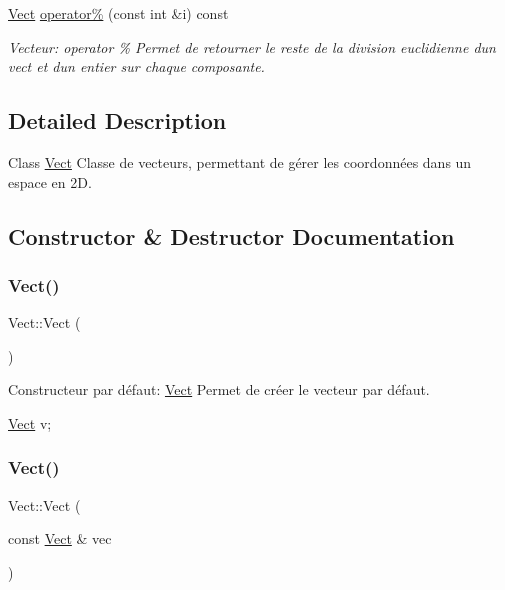 \begin{DoxyCompactItemize}
\hyperlink{classVect}{Vect} \hyperlink{classVect_a7c95db0096c212593a83992d8c9cc42a}{operator\%} (const int \&i) const
\begin{DoxyCompactList}\small\item\em Vecteur\+: operator \% Permet de retourner le reste de la division euclidienne d\textquotesingle{}un vect et d\textquotesingle{}un entier sur chaque composante. \end{DoxyCompactList}\end{DoxyCompactItemize}


\subsection{Detailed Description}
Class \hyperlink{classVect}{Vect} Classe de vecteurs, permettant de gérer les coordonnées dans un espace en 2D. 

\subsection{Constructor \& Destructor Documentation}
\mbox{\label{classVect_a1c153510458899146850b79a7277630b}} 
\subsubsection{\texorpdfstring{Vect()}{Vect()}\hspace{0.1cm}{\footnotesize\ttfamily [1/3]}}
{\footnotesize\ttfamily Vect\+::\+Vect (\begin{DoxyParamCaption}{ }\end{DoxyParamCaption})}



Constructeur par défaut\+: \hyperlink{classVect}{Vect} Permet de créer le vecteur par défaut. 


\begin{DoxyCode}
\hyperlink{classVect}{Vect} v;
\end{DoxyCode}
 \mbox{\label{classVect_af8a503f3e10b3ec27582e47fbbf3c66f}} 
\subsubsection{\texorpdfstring{Vect()}{Vect()}\hspace{0.1cm}{\footnotesize\ttfamily [2/3]}}
{\footnotesize\ttfamily Vect\+::\+Vect (\begin{DoxyParamCaption}\item[{const \hyperlink{classVect}{Vect} \&}]{vec }\end{DoxyParamCaption})}



